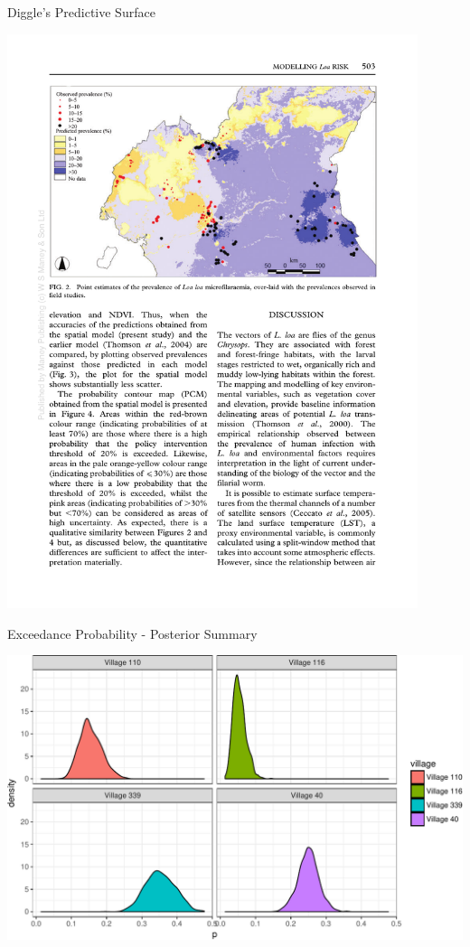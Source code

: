 \documentclass[11pt,ignorenonframetext,]{beamer}
\begin{document}
\begin{frame}{Diggle's Predictive Surface}

\begin{center}
\includegraphics[width=0.9\textwidth]{figs/diggle_fig2.pdf}
\end{center}

\end{frame}

\begin{frame}{Exceedance Probability - Posterior Summary}

\includegraphics{Lec21_files/figure-beamer/unnamed-chunk-15-1.pdf}

\end{frame}
\end{document}
